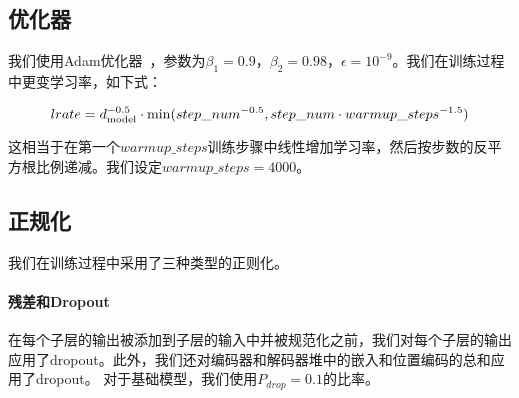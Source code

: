 \subsection{优化器} 


我们使用Adam优化器~\citep{kingma2014adam}，参数为$\beta_1=0.9$，$\beta_2=0.98$，$\epsilon=10^{-9}$。我们在训练过程中更变学习率，如下式：

\begin{equation}
lrate = d_{\text{model}}^{-0.5} \cdot
  \min({step\_num}^{-0.5},
    {step\_num} \cdot {warmup\_steps}^{-1.5})
\end{equation}


这相当于在第一个$warmup\_steps$训练步骤中线性增加学习率，然后按步数的反平方根比例递减。我们设定$warmup\_steps=4000$。

\subsection{正规化} \label{sec:reg}

我们在训练过程中采用了三种类型的正则化。
\paragraph{残差和Dropout} 在每个子层的输出被添加到子层的输入中并被规范化之前，我们对每个子层的输出应用了dropout\citep{srivastava2014dropout}。此外，我们还对编码器和解码器堆中的嵌入和位置编码的总和应用了dropout。 对于基础模型，我们使用$P_{drop}=0.1$的比率。


